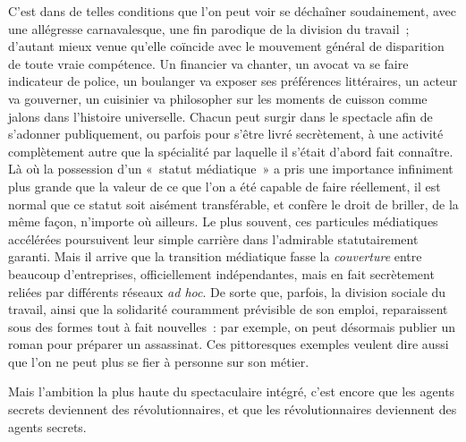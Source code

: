 \documentclass[french,twoside]{book} %
\def\bignobreak{\ifdim\lastskip<\bigskipamount
  \removelastskip\nopagebreak\bigskip\fi}
\newcommand{\labelblock}[1]{\bigbreak{\color{rubric}\noindent\textbf{#1}\par}\bignobreak}
\begin{document}
C’est dans de telles conditions que l’on peut voir se déchaîner soudainement, avec une allégresse carnavalesque, une fin parodique de la division du travail ; d’autant mieux venue qu’elle coïncide avec le mouvement général de disparition de toute vraie compétence. Un financier va chanter, un avocat va se faire indicateur de police, un boulanger va exposer ses préférences littéraires, un acteur va gouverner, un cuisinier va philosopher sur les moments de cuisson comme jalons dans l’histoire universelle. Chacun peut surgir dans le spectacle afin de s’adonner publiquement, ou parfois pour s’être livré secrètement, à une activité complètement autre que la spécialité par laquelle il s’était d’abord fait connaître. Là où la possession d’un « statut médiatique » a pris une importance infiniment plus grande que la valeur de ce que l’on a été capable de faire réellement, il est normal que ce statut soit aisément transférable, et confère le droit de briller, de la même façon, n’importe où ailleurs. Le plus souvent, ces particules médiatiques accélérées poursuivent leur simple carrière dans l’admirable statutairement garanti. Mais il arrive que la transition médiatique fasse la \emph{couverture} entre beaucoup d’entreprises, officiellement indépendantes, mais en fait secrètement reliées par différents réseaux \emph{ad hoc}. De sorte que, parfois, la division sociale du travail, ainsi que la solidarité couramment prévisible de son emploi, reparaissent sous des formes tout à fait nouvelles : par exemple, on peut désormais publier un roman pour préparer un assassinat. Ces pittoresques exemples veulent dire aussi que l’on ne peut plus se fier à personne sur son métier.\par
Mais l’ambition la plus haute du spectaculaire intégré, c’est encore que les agents secrets deviennent des révolutionnaires, et que les révolutionnaires deviennent des agents secrets.\par

\labelblock{V}
\end{document}
